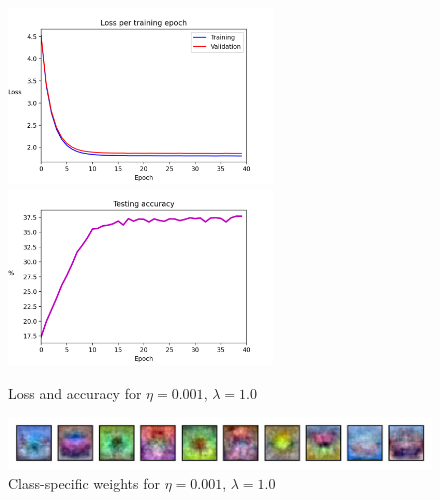 \documentclass{article}
\begin{document}
	\begin{figure}[h!]
		\centering
		\includegraphics[width=7cm]{../plots/loss_v4.png}
		\includegraphics[width=7cm]{../plots/acc_v4.png}
		\caption{Loss and accuracy for $\eta=0.001$, $\lambda=1.0$}
		\vspace{0.2cm}
		\includegraphics[width=12cm]{../plots/weights_v4.png}
		\caption{Class-specific weights for $\eta=0.001$, $\lambda=1.0$}
	\end{figure}
\end{document}
